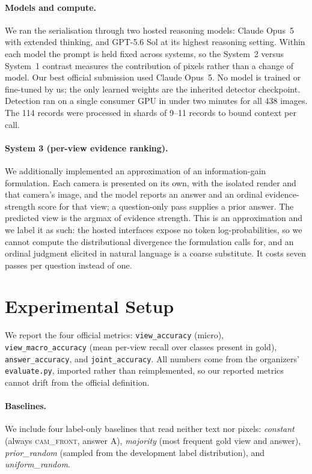 \documentclass[11pt]{article}
\begin{document}
\paragraph{Models and compute.} We ran the serialisation through two hosted
reasoning models: Claude Opus~5 with extended thinking, and GPT-5.6 Sol at its
highest reasoning setting. Within each model the prompt is held fixed across
systems, so the System~2 versus System~1 contrast measures the contribution of
pixels rather than a change of model. Our best official submission used Claude
Opus~5. No model is trained or fine-tuned by us; the only learned weights are
the inherited detector checkpoint. Detection ran on a single consumer GPU in
under two minutes for all 438 images. The 114 records were processed in shards
of 9--11 records to bound context per call.

\paragraph{System 3 (per-view evidence ranking).} We additionally implemented an
approximation of an information-gain formulation. Each camera is presented on
its own, with the isolated render and that camera's image, and the model reports
an answer and an ordinal evidence-strength score for that view; a question-only
pass supplies a prior answer. The predicted view is the argmax of evidence
strength. This is an approximation and we label it as such: the hosted
interfaces expose no token log-probabilities, so we cannot compute the
distributional divergence the formulation calls for, and an ordinal judgment
elicited in natural language is a coarse substitute. It costs seven passes per
question instead of one.

\section{Experimental Setup}
\label{sec:setup}

We report the four official metrics: \texttt{view\_accuracy} (micro),
\texttt{view\_macro\_accuracy} (mean per-view recall over classes present in
gold), \texttt{answer\_accuracy}, and \texttt{joint\_accuracy}. All numbers
come from the organizers' \texttt{evaluate.py}, imported rather than
reimplemented, so our reported metrics cannot drift from the official
definition.

\paragraph{Baselines.} We include four label-only baselines that read neither
text nor pixels: \textit{constant} (always \textsc{cam\_front}, answer A),
\textit{majority} (most frequent gold view and answer), \textit{prior\_random}
(sampled from the development label distribution), and
\textit{uniform\_random}.
\end{document}
